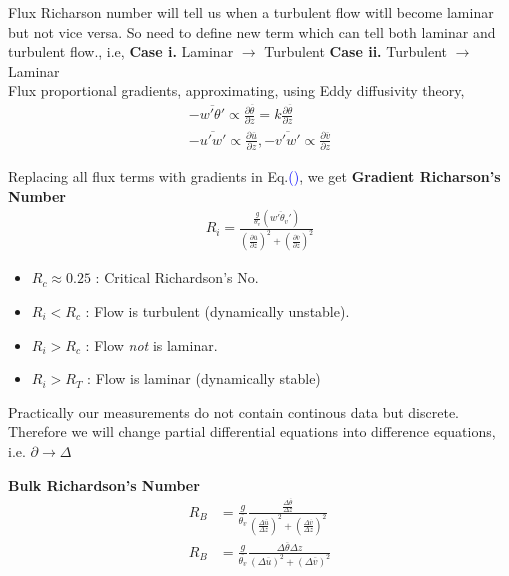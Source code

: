 \documentclass[fleqn,10pt]{SelfArx} %
\newcommand{\myeqref}[1]{Eq.\textcolor{blue}{\textup{(\getrefnumber{#1})}}}
\begin{document}
Flux Richarson number will tell us when a turbulent flow witll become laminar but not vice versa. So need to define new term which can tell both laminar and turbulent flow., i.e,\newline
\textbf{Case i.} Laminar \(\rightarrow\) Turbulent \newline
\textbf{Case ii.} Turbulent \(\rightarrow\) Laminar  \\

Flux proportional gradients, approximating, using Eddy diffusivity theory,
\begin{align*}
	-\overline{w'\theta'} \propto \frac{\partial \overline{\theta}}{\partial z} = k\frac{\partial \overline{\theta}}{\partial z} \\
	-\overline{u'w'} \propto \frac{\partial \overline{u}}{\partial z}, -\overline{v'w'} \propto \frac{\partial \overline{v}}{\partial z}
\end{align*}

Replacing all flux terms with gradients in \myeqref{eq:15.2}, we get \textbf{Gradient Richarson's Number}
\begin{align*}
	R_i = \frac{\frac{g}{\theta_v}\left(\overline{w'\theta_v'}\right)}{\left(\frac{\partial \overline{u}}{\partial z}\right)^2 + \left(\frac{\partial \overline{v}}{\partial z}\right)^2} \tag{15.3} \label{eq:15.3}
\end{align*}

\begin{itemize}[noitemsep]
	\item \(R_c \approx 0.25 \) : Critical Richardson's No.
	\item \(R_i < R_c\) : Flow is turbulent (dynamically unstable).
	\item \( R_i > R_c \) : Flow \textit{not} is laminar.
	\item \( R_i > R_T \) : Flow is laminar (dynamically stable)
\end{itemize}

Practically our measurements do not contain continous data but discrete. Therefore we will change partial differential equations into difference equations, i.e. \(\partial \rightarrow \Delta\)

\textbf{Bulk Richardson's Number}
\begin{align*}
	R_B &= \frac{g}{\overline{\theta_v}}\frac{\frac{\Delta \overline{\theta}}{\Delta z}}{\left(\frac{\Delta \overline{u}}{\Delta z}\right)^2 + \left(\frac{\Delta \overline{v}}{\Delta z}\right)^2} \\
	R_B &= \frac{g}{\overline{\theta_v}}\frac{\Delta \overline{\theta}\Delta z}{\left(\Delta \overline{u}\right)^2 + \left(\Delta \overline{v}\right)^2} \tag{15.4} \label{eq:15.4}
\end{align*}
\end{document}
